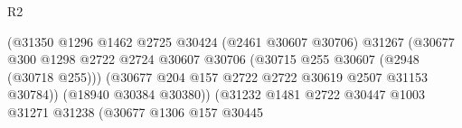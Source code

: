\begin{lexlean}{R2}
\begin{coremodule}
                                                        (@31350
                                                          @1296
                                                          @1462
                                                          @2725
                                                          @30424
                                                          (@2461 @30607 @30706)
                                                          @31267
                                                          (@30677
                                                            @300
                                                            @1298
                                                            @2722
                                                            @2724
                                                            @30607
                                                            @30706
                                                            (@30715
                                                              @255
                                                              @30607
                                                              (@2948 (@30718 @255)))
                                                            (@30677
                                                              @204
                                                              @157
                                                              @2722
                                                              @2722
                                                              @30619
                                                              @2507
                                                              @31153
                                                              @30784))
                                                          (@18940 @30384 @30380))
                                                        (@31232
                                                          @1481
                                                          @2722
                                                          @30447
                                                          @1003
                                                          @31271
                                                          @31238
                                                          (@30677
                                                            @1306
                                                            @157
                                                            @30445

\end{coremodule}
\end{lexlean}
